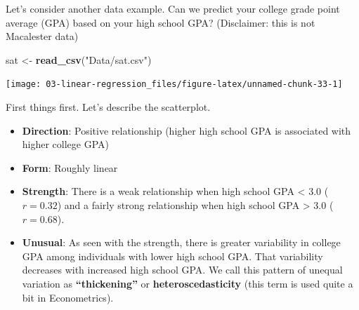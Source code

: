 \documentclass[
]{book}
\newenvironment{Shaded}{\begin{snugshade}}{\end{snugshade}}
\newcommand{\DataTypeTok}[1]{\textcolor[rgb]{0.13,0.29,0.53}{#1}}
\newcommand{\KeywordTok}[1]{\textcolor[rgb]{0.13,0.29,0.53}{\textbf{#1}}}
\newcommand{\NormalTok}[1]{#1}
\newcommand{\OperatorTok}[1]{\textcolor[rgb]{0.81,0.36,0.00}{\textbf{#1}}}
\newcommand{\OtherTok}[1]{\textcolor[rgb]{0.56,0.35,0.01}{#1}}
\newcommand{\StringTok}[1]{\textcolor[rgb]{0.31,0.60,0.02}{#1}}
\providecommand{\tightlist}{%
  \setlength{\itemsep}{0pt}\setlength{\parskip}{0pt}}
\begin{document}
Let's consider another data example. Can we predict your college grade point average (GPA) based on your high school GPA? (Disclaimer: this is not Macalester data)

\begin{Shaded}
\begin{Highlighting}[]
\NormalTok{sat <-}\StringTok{ }\KeywordTok{read_csv}\NormalTok{(}\StringTok{"Data/sat.csv"}\NormalTok{)}
\end{Highlighting}
\end{Shaded}

\begin{Shaded}
\end{Shaded}

\begin{center}\texttt{[image: 03-linear-regression\_files/figure-latex/unnamed-chunk-33-1]} \end{center}

First things first. Let's describe the scatterplot.

\begin{itemize}
\tightlist
\item
  \textbf{Direction}: Positive relationship (higher high school GPA is associated with higher college GPA)
\item
  \textbf{Form}: Roughly linear
\item
  \textbf{Strength}: There is a weak relationship when high school GPA \textless{} 3.0 (\(r = 0.32\)) and a fairly strong relationship when high school GPA \textgreater{} 3.0 (\(r = 0.68\)).
\item
  \textbf{Unusual}: As seen with the strength, there is greater variability in college GPA among individuals with lower high school GPA. That variability decreases with increased high school GPA. We call this pattern of unequal variation as \textbf{``thickening''} or \textbf{heteroscedasticity} (this term is used quite a bit in Econometrics).
\end{itemize}
\end{document}
